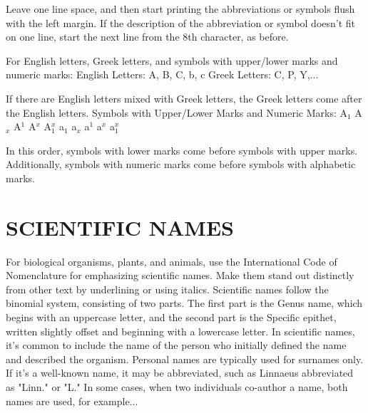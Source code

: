 Leave one line space, and then start printing the abbreviations or symbols flush with the left margin. If the description of the abbreviation or symbol doesn't fit on one line, start the next line from the 8th character, as before.

For English letters, Greek letters, and symbols with upper/lower marks and numeric marks: English Letters: A, B, C, b, c Greek Letters: C, P, Y,...

If there are English letters mixed with Greek letters, the Greek letters come after the English letters. Symbols with Upper/Lower Marks and Numeric Marks: A$_1$ A$_x$ A$^1$ A$^x$ A$_1^x$ a$_1$ a$_x$ a$^1$ a$^x$ a$_1^x$

In this order, symbols with lower marks come before symbols with upper marks. Additionally, symbols with numeric marks come before symbols with alphabetic marks.

\section{SCIENTIFIC NAMES}

For biological organisms, plants, and animals, use the International Code of Nomenclature for emphasizing scientific names. Make them stand out distinctly from other text by underlining or using italics. Scientific names follow the binomial system, consisting of two parts. The first part is the Genus name, which begins with an uppercase letter, and the second part is the Specific epithet, written slightly offset and beginning with a lowercase letter. In scientific names, it's common to include the name of the person who initially defined the name and described the organism. Personal names are typically used for surnames only. If it's a well-known name, it may be abbreviated, such as Linnaeus abbreviated as "Linn." or "L." In some cases, when two individuals co-author a name, both names are used, for example...


